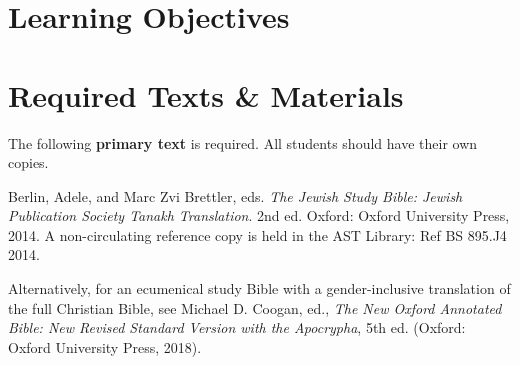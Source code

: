 \documentclass[titlepage]{article}
\newcommand\incl{../includes}
\begin{document}


  \section{Learning Objectives}
  \label{objectives}

  \edobject

\section{Required Texts \& Materials}
\label{texts}

The following \textbf{primary text} is required. All students should have their own copies.

\begingroup
\renewcommand{\section}[2]{}%
\begin{thebibliography}{NJPS}%

	 Berlin, Adele, and Marc Zvi Brettler, eds.
    \emph{The Jewish Study Bible: Jewish Publication Society Tanakh Translation}.
    2nd ed. Oxford: Oxford University Press, 2014.
     A non-circulating reference copy is held in the AST Library: Ref BS 895.J4 2014.

\end{thebibliography}
\endgroup

Alternatively, for an ecumenical study Bible with a gender-inclusive
translation of the full Christian Bible, see Michael D. Coogan, ed.,
\emph{The New Oxford Annotated Bible: New Revised Standard Version with
the Apocrypha}, 5th ed. (Oxford: Oxford University Press, 2018).

\end{document}
